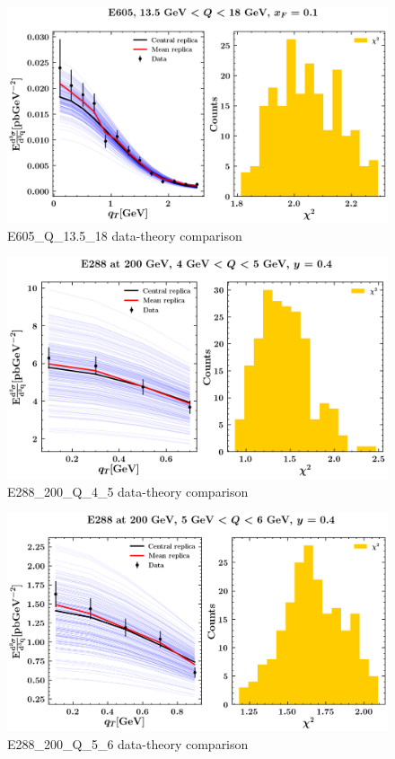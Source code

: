 \documentclass[
]{article}
\begin{document}
\begin{figure}
\centering
\includegraphics{pngplots/E605_Q_13.5_18.png}
\caption{E605\_Q\_13.5\_18 data-theory comparison}
\end{figure}

\begin{figure}
\centering
\includegraphics{pngplots/E288_200_Q_4_5.png}
\caption{E288\_200\_Q\_4\_5 data-theory comparison}
\end{figure}

\begin{figure}
\centering
\includegraphics{pngplots/E288_200_Q_5_6.png}
\caption{E288\_200\_Q\_5\_6 data-theory comparison}
\end{figure}
\end{document}
